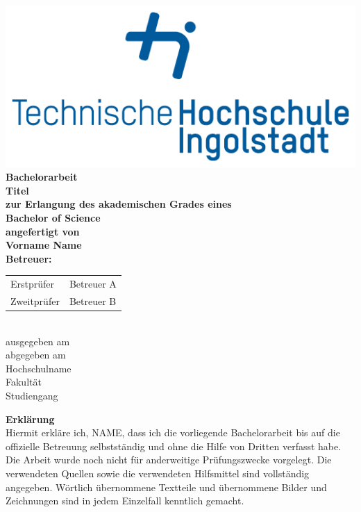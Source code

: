 \documentclass[a4paper, 12pt, oneside, openright]{article}
\begin{document}
\begin{titlepage}
\begin{center}
\centering
\includegraphics[scale=0.3]{thi_logo_wb_RGB}\\
\vspace{1.5cm}
\textbf{\large Bachelorarbeit\\}
\vspace{0.5cm}
\textbf{\LARGE Titel}\\
\vspace{1.0cm}
\textbf{zur Erlangung des akademischen Grades eines\\Bachelor of Science\\}
\vspace{2.0cm}
\textbf{angefertigt von\\Vorname Name\\}
\vspace{2.0cm}
\textbf{Betreuer:\\}
\vspace{0.5cm}
\begin{tabular}{l l}
Erstprüfer & Betreuer A\\
Zweitprüfer & Betreuer B\\           
\end{tabular}\\
\vspace{0.5cm}
ausgegeben am \\
abgegeben am \\
\vfill
Hochschulname\\
Fakultät\\
Studiengang\\
\end{center}
\end{titlepage}

{}
\textbf{\Large Erklärung}
\vspace{1.0cm}\\
Hiermit erkläre ich, NAME, dass ich die vorliegende Bachelorarbeit bis auf die offizielle
Betreuung selbstständig und ohne die Hilfe von Dritten verfasst habe. Die Arbeit wurde noch
nicht für anderweitige Prüfungszwecke vorgelegt.
Die verwendeten Quellen sowie die verwendeten Hilfsmittel sind vollständig angegeben. Wörtlich
übernommene Textteile und übernommene Bilder und Zeichnungen sind in jedem Einzelfall
kenntlich gemacht.
\vspace{2.0cm}\\
\end{document}
